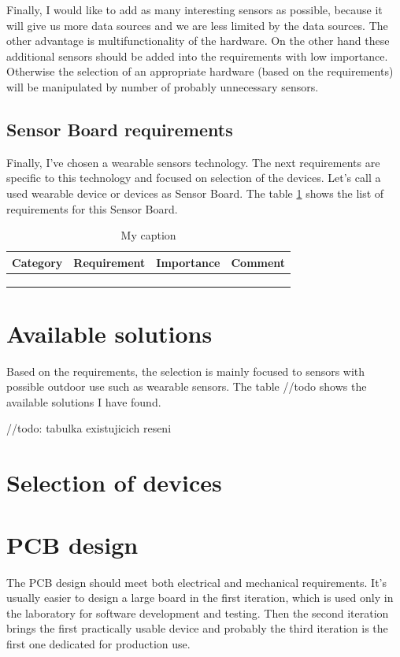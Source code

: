 \documentclass[12pt,a4paper]{article}
\begin{document}
Finally, I would like to add as many interesting sensors as possible, because it will give us more data sources and we are less limited by the data sources. The other advantage is multifunctionality of the hardware. On the other hand these additional sensors should be added into the requirements with low importance. Otherwise the selection of an appropriate hardware (based on the requirements) will be manipulated by number of probably unnecessary sensors.

\subsection{Sensor Board requirements}
Finally, I've chosen a wearable sensors technology. The next requirements are specific to this technology and focused on selection of the devices. Let's call a used wearable device or devices as Sensor Board. The table \ref{HWrequirements} shows the list of requirements for this Sensor Board.

\begin{table}[]
\centering
\caption{My caption}
\label{HWrequirements}
\begin{tabular}{|l|l|l|l|}
\hline
Category & Requirement & Importance & Comment \\ \hline
         &             &            &         \\ \hline
         &             &            &         \\ \hline
         &             &            &         \\ \hline
\end{tabular}
\end{table}

\section{Available solutions}
Based on the requirements, the selection is mainly focused to sensors with possible outdoor use such as wearable sensors. The table //todo shows the available solutions I have found.

//todo: tabulka existujicich reseni

\section{Selection of devices}

\section{PCB design}
The PCB design should meet both electrical and mechanical requirements. It's usually easier to design a large board in the first iteration, which is used only in the laboratory for software development and testing. Then the second iteration brings the first practically usable device and probably the third iteration is the first one dedicated for production use.
\end{document}
